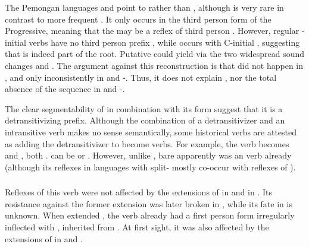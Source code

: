 The Pemongan languages and \kaxui point to  rather than , although \kaxui {} is very rare in contrast to more frequent .
It only occurs in the third person form of the Progressive, meaning that the  may be a reflex of third person .
However, regular -initial \kaxui verbs have no third person prefix , while  occurs with C-initial  , suggesting that  is indeed part of the root.
Putative \PC {} could yield  via the two widespread sound changes  and  \parencite{meira2010origin}.
The argument against this reconstruction is that  did not happen in \PPar, and only inconsistently in \PPP and \mapoyo-\yawarana \parencites[501--502]{meira2010origin}{gildea2010story}.
Thus, it does not explain \kaxui {}, nor the total absence of the sequence  in \panare and \mapoyo-\yawarana.
%
%

The clear segmentability of  in combination with its form suggest that it is a detransitivizing prefix.
Although the combination of a detransitivizer and an intransitive verb makes no sense semantically, some historical  verbs are attested as adding the detransitivizer to become  verbs.
For example, the \PC {} verb   becomes \trio {} \parencite[252]{triomeira1999} and \kalina {} \parencite[429]{courtz2008carib}, both .
\waiwai {} can be  \parencite[30]{waiwaihawkins1998} or  \parencite[204]{hawkins1953waiwai}.
However, unlike , bare   apparently was an  verb already (although its reflexes in languages with split- mostly co-occur with reflexes of ).

\subsubsection{ }
\label{sec:godown}
Reflexes of this verb were not affected by the extensions of  in \PPek {} and  in \akuriyo {}.
Its resistance against the former extension was later broken in \bakairi, while its fate in \ikpeng is unknown.
When \akuriyo extended , the verb already had a first person form irregularly inflected with , inherited from \PTir.
At first sight, it was also affected by the extensions of  in \carijo {} and \yukpa {}.

